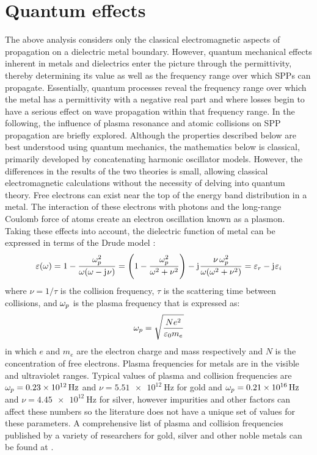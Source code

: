 \documentclass[11pt]{article}
\begin{document}
\section{Quantum effects}
%
The above analysis considers only the classical electromagnetic aspects of propagation on a dielectric metal boundary. However, quantum mechanical effects inherent in metals and dielectrics enter the picture through the permittivity, thereby determining its value as well as the frequency range over which SPPs can propagate. Essentially, quantum processes reveal the frequency range over which the metal has a permittivity with a negative real part and where losses begin to have a serious effect on wave propagation within that frequency range. In the following, the influence of plasma resonance and atomic collisions on SPP propagation are briefly explored.  Although the properties described below are best understood using quantum mechanics, the mathematics below is classical, primarily developed by concatenating harmonic oscillator models. However, the differences in the results of the two theories is small, allowing classical electromagnetic calculations without the necessity of delving into quantum theory.
Free electrons can exist near the top of the energy band distribution in a metal. The interaction of these electrons with photons and the long-range Coulomb force of atoms create an electron oscillation known as a plasmon. Taking these effects into account, the dielectric function of metal can be expressed in terms of the Drude model \cite{MaxBorn2002}:
%
\begin{equation}
  \varepsilon(\omega) = 1 - \frac{\omega_p^2}{\omega(\omega  - \mathrm{j}\mkern1mu \nu)} = \left(1 - \frac{\omega_p^2}{\omega^2 + \nu^2} \right) - \mathrm{j}\mkern1mu \frac{\nu \, \omega_p^2}{\omega (\omega^2 + \nu^2)} = \varepsilon_r - \mathrm{j}\mkern1mu \varepsilon_i
  \label{eq:drude}
\end{equation}
%
where $\nu = 1/\tau$ is the collision frequency, $\tau$ is the scattering time between collisions, and $\omega_p$ is the plasma frequency that is expressed as:
%
\begin{equation}
  \omega_p = \sqrt{\frac{N e^2}{\varepsilon_0 m_e}}
  \label{eq:plasma_f}
\end{equation}
%
in which $e$ and $m_e$ are the electron charge and mass respectively and $N$ is the concentration of free electrons. Plasma frequencies for metals are in the visible and ultraviolet ranges. Typical values of plasma and collision frequencies are $\O_p = \SI{.23e12}{\Hz}$ and
$\nu = \SI{5.51e12}{\Hz}$ for gold and $\O_p = \SI{.21e16}{\Hz}$ and $\nu = \SI{4.45e12}{\Hz}$ for silver, however impurities and other factors can affect these numbers so the literature does not have a unique set of values for these parameters. A comprehensive list of plasma and collision frequencies published by a variety of researchers for gold, silver and other noble metals can be found at \cite{Moroz2010}.
\end{document}
